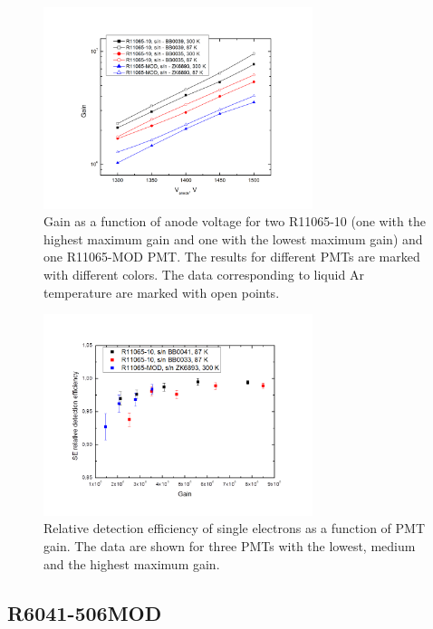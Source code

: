 \documentclass[a4paper,11pt]{article}
\begin{document}
\begin{figure}[htbp]
\centering
\includegraphics[width=0.7\textwidth,viewport=1 1 700 500,clip]{figures/R11065gain.png}
\caption{Gain as a function of anode voltage for two R11065-10 (one with the highest maximum gain and one with the lowest maximum gain) 
and one R11065-MOD PMT. The results for different PMTs are marked with different colors. The data corresponding to liquid Ar temperature 
are marked with open points.}
\label{fig:R11065gain}
\end{figure}
\begin{figure}[htbp]
\centering
\includegraphics[width=0.7\textwidth,viewport=1 1 700 500,clip]{figures/R11065eff.png}
\caption{Relative detection efficiency of single electrons as a function of PMT gain. The data are shown for three PMTs 
with the lowest, medium and the highest maximum gain.}
\label{fig:R11065eff}
\end{figure}

\subsection{R6041-506MOD}
\end{document}
